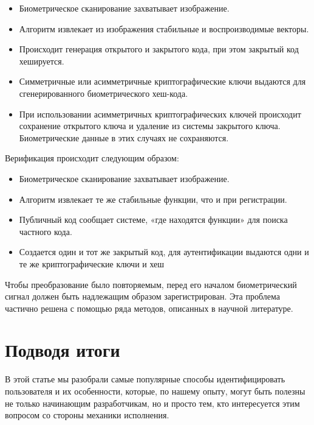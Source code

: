 \documentclass[a4paper,12pt]{extreport}
\begin{document}
\begin{itemize}
	\item Биометрическое сканирование захватывает изображение.
	\item Алгоритм извлекает из изображения стабильные и воспроизводимые векторы.
	\item Происходит генерация открытого и закрытого кода, при этом закрытый код хешируется.
	\item Симметричные или асимметричные криптографические ключи выдаются для сгенерированного биометрического хеш-кода.
	\item При использовании асимметричных криптографических ключей происходит сохранение открытого ключа и удаление из системы закрытого ключа. Биометрические данные в этих случаях не сохраняются.
\end{itemize}

Верификация происходит следующим образом:
\begin{itemize}
	\item Биометрическое сканирование захватывает изображение.
	\item Алгоритм извлекает те же стабильные функции, что и при регистрации.
	\item Публичный код сообщает системе, «где находятся функции» для поиска частного кода.
	\item Создается один и тот же закрытый код, для аутентификации выдаются одни и те же криптографические ключи и хеш
\end{itemize}

Чтобы преобразование было повторяемым, перед его началом биометрический сигнал должен быть надлежащим образом зарегистрирован. Эта проблема частично решена с помощью ряда методов, описанных в научной литературе.

\section{Подводя итоги}

В этой статье мы разобрали самые популярные способы идентифицировать пользователя и их особенности, которые, по нашему опыту, могут быть полезны не только начинающим разработчикам, но и просто тем, кто интересуется этим вопросом со стороны механики исполнения.
\end{document}
